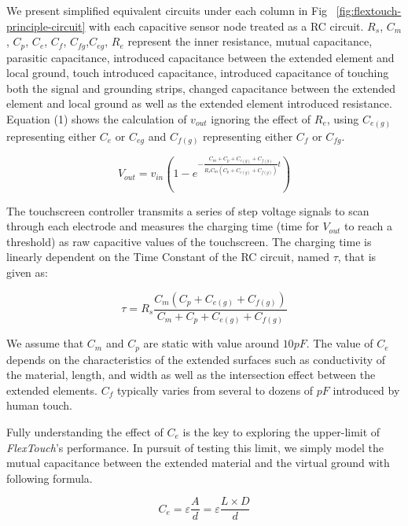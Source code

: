 We present simplified equivalent circuits under each column in Fig ~\ref{fig:flextouch-principle-circuit} with each capacitive sensor node treated as a RC circuit. $R_{s}$, $C_{m}$, $C_{p}$, $C_{e}$, $C_{f}$, $C_{fg}$,$C_{eg}$, $R_{e}$ represent the inner resistance, mutual capacitance, parasitic capacitance, introduced capacitance between the extended element and local ground, touch introduced capacitance, introduced capacitance of touching both the signal and grounding strips, changed capacitance between the extended element and local ground as well as the extended element introduced resistance. Equation (1) shows the calculation of $v_{out}$ ignoring the effect of $R_{e}$, using $C_{e(g)}$ representing either $C_{e}$ or $C_{eg}$ and $C_{f(g)}$ representing either $C_{f}$ or $C_{fg}$.

\begin{equation}
    V_{out} = v_{in}(1-e^{-\frac{C_{m} + C_{p} + C_{e(g)} + C_{f(g)}}{R_{s}C_{m}(C_{p} + C_{e(g)} + C_{f(g)})}t})
\end{equation}


The touchscreen controller transmits a series of step voltage signals to scan through each electrode and measures the charging time (time for $V_{out}$ to reach a threshold) as raw capacitive values of the touchscreen. The charging time is linearly dependent on the Time Constant of the RC circuit, named $\tau$, that is given as:

\begin{equation}
    \tau = R_{s}\frac{C_{m}(C_{p} + C_{e(g)} + C_{f(g)})}{C_{m} + C_{p} + C_{e(g)} + C_{f(g)}}
\end{equation}

 
We assume that $C_{m}$ and $C_{p}$ are static with value around $10pF$. The value of $C_{e}$ depends on the characteristics of the extended surfaces such as conductivity of the material, length, and width as well as the intersection effect between the extended elements. $C_{f}$ typically varies from several to dozens of $pF$ introduced by human touch. 

Fully understanding the effect of $C_{e}$ is the key to exploring the upper-limit of \textit{FlexTouch}'s performance. In pursuit of testing this limit, we simply model the mutual capacitance between the extended material and the virtual ground with following formula.

\begin{equation}
    C_{e} = \varepsilon \frac{A}{d} = \varepsilon \frac{L \times D}{d}
\end{equation}

